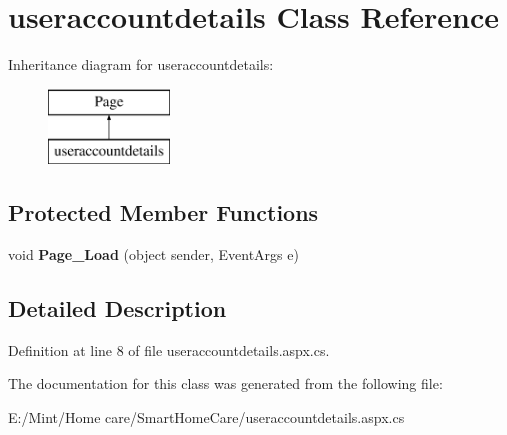 \hypertarget{classuseraccountdetails}{\section{useraccountdetails Class Reference}
\label{classuseraccountdetails}
}
Inheritance diagram for useraccountdetails\-:\begin{figure}[H]
\begin{center}
\leavevmode
\includegraphics[height=2.000000cm]{classuseraccountdetails}
\end{center}
\end{figure}
\subsection*{Protected Member Functions}
\begin{DoxyCompactItemize}
\item 
\hypertarget{classuseraccountdetails_a38a632cbcb82d51c5619b58a45a1ade3}{void {\bfseries Page\-\_\-\-Load} (object sender, Event\-Args e)}\label{classuseraccountdetails_a38a632cbcb82d51c5619b58a45a1ade3}

\end{DoxyCompactItemize}


\subsection{Detailed Description}


Definition at line 8 of file useraccountdetails.\-aspx.\-cs.



The documentation for this class was generated from the following file\-:\begin{DoxyCompactItemize}
\item 
E\-:/\-Mint/\-Home care/\-Smart\-Home\-Care/useraccountdetails.\-aspx.\-cs\end{DoxyCompactItemize}

